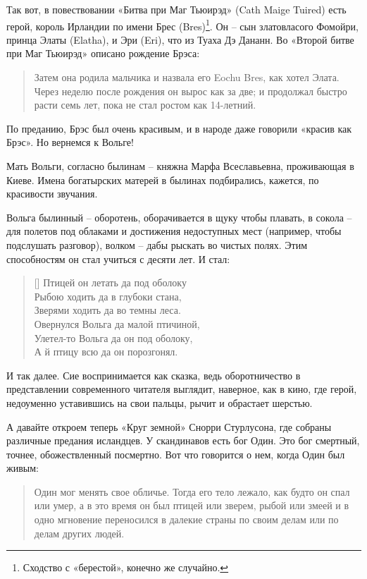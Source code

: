 Так вот, в повествовании «Битва при Маг Тьюирэд» (Cath Maige Tuired) есть герой, король Ирландии по имени Брес (Bres)\footnote{Сходство с «берестой», конечно же случайно.}. Он – сын златовласого Фомойри, принца  Элаты (Elatha), и Эри (Eri), что из Туаха Дэ Дананн. Во «Второй битве при Маг Тьюирэд» описано рождение Брэса\cite{cathmaigetuired}:

\begin{quotation}
Затем она родила мальчика и назвала его Eochu Bres, как хотел Элата. Через неделю после рождения он вырос как за две; и продолжал быстро расти семь лет, пока не стал ростом как 14-летний.
\end{quotation}

По преданию, Брэс был очень красивым, и в народе даже говорили «красив как Брэс». Но вернемся к Вольге!

Мать Вольги, согласно былинам – княжна Марфа Всеславьевна, проживающая в Киеве. Имена богатырских матерей в былинах подбирались, кажется, по красивости звучания.

Вольга былинный – оборотень, оборачивается в щуку чтобы плавать, в сокола – для полетов под облаками и достижения недоступных мест (например, чтобы подслушать разговор), волком – дабы рыскать во чистых полях. Этим способностям он стал учиться с десяти лет. И стал:

\settowidth{\versewidth}{Овернулся Вольга да малой птичиной,} 
\begin{verse}[\versewidth]
Птицей он летать да под оболоку\\
Рыбою ходить да в глубоки стана,\\
Зверями ходить да во темны леса.\\
Овернулся Вольга да малой птичиной,\\
Улетел-то Вольга да он под оболоку,\\
А й птицу всю да он порозгонял.
\end{verse}

И так далее. Сие воспринимается как сказка, ведь оборотничество в представлении современного читателя выглядит, наверное, как в кино, где герой, недоуменно уставившись на свои пальцы, рычит и обрастает шерстью. 

А давайте откроем теперь «Круг земной»\cite{snorry01} Снорри Стурлусона, где собраны различные предания исландцев. У скандинавов есть бог Один. Это бог смертный, точнее, обожествленный посмертно. Вот что говорится о нем, когда Один был живым:

\begin{quotation}
Один мог менять свое обличье. Тогда его тело лежало, как будто он спал или умер, а в это время он был птицей или зверем, рыбой или змеей и в одно мгновение переносился в далекие страны по своим делам или по делам других людей.
\end{quotation}


